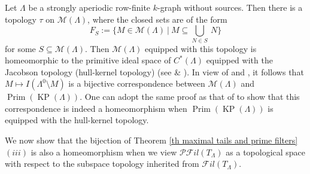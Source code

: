 \documentclass[a4paper,reqno,12pt]{amsart}
\numberwithin{equation}{section}
\theoremstyle{definition}
\theoremstyle{remark}
\newcommand{\Prim}{\operatorname{Prim}}
\newcommand{\KP}{\operatorname{KP}}
\begin{document}
Let $\Lambda$ be a strongly aperiodic row-finite $k$-graph without sources. Then there is a topology $\tau$ on $\mathscr{M}(\Lambda)$, where the closed sets are of the form \[F_S:=\{M\in \mathscr{M}(\Lambda)~|~M\subseteq \displaystyle{\bigcup_{N\in S}}~N\}\] for some $S\subseteq \mathscr{M}(\Lambda)$. Then $\mathscr{M}(\Lambda)$ equipped with this topology is homeomorphic to the primitive ideal space of $C^*(\Lambda)$ equipped with the Jacobson topology (hull-kernel topology) (see \cite[Theorem 6.3]{BPRS} \& \cite[Theorem 3.15]{KangPask}). In view of \cite[Theorem 5.1]{Pino} and \cite[Proposition 4.2]{Larki}, it follows that $M\longmapsto I(\Lambda^0\setminus M)$ is a bijective correspondence between $\mathscr{M}(\Lambda)$ and $\Prim(\KP(\Lambda))$. One can adopt the same proof as that of \cite[Theorem 6.3]{BPRS} to show that this correspondence is indeed a homeomorphism when $\Prim(\KP(\Lambda))$ is equipped with the hull-kernel topology. 

We now show that the bijection of Theorem \ref{th maximal tails and prime filters}$(iii)$ is also a homeomorphism when we view $\mathscr{P}\mathscr{F}il(T_\Lambda)$ as a topological space with respect to the subspace topology inherited from $\mathscr{F}il(T_\Lambda)$. 
\end{document}
